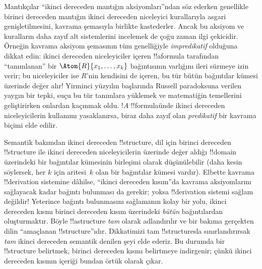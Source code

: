Mantıkçılar ``ikinci dereceden mantığın aksiyomları''ndan söz ederken genellikle
birinci dereceden mantığın ikinci dereceden niceleyici kurallarıyla asgari
genişletilmesini, kavrama şemasıyla birlikte kastederler. Ancak bu aksiyom ve
kuralların daha zayıf alt sistemlerini incelemek de çoğu zaman ilgi çekicidir.
Örneğin kavrama aksiyom şemasının tüm genelliğiyle \emph{impredikatif}
olduğuna dikkat edin: ikinci dereceden niceleyiciler içeren !!a{formula}
tarafından ``tanımlanan'' bir $\Atom{R}{x_1, \dots, x_k}$ bağıntısının varlığını
ileri sürmeye izin verir; bu niceleyiciler ise $R$'nin kendisini de içeren,
bu tür bütün bağıntılar kümesi üzerinde değer alır!{} Yirminci yüzyılın
başlarında Russell paradoksuna verilen yaygın bir tepki, suçu bu tür
tanımlara yüklemek ve matematiğin temellerini geliştirirken onlardan kaçınmak
oldu. $!A$ !!{formula}{}ünde ikinci dereceden niceleyicilerin kullanımı
yasaklanırsa, biraz daha zayıf olan {\em predikatif} bir kavrama biçimi elde
edilir.

Semantik bakımdan ikinci dereceden !!{structure}, dil için birinci dereceden
!!{structure} ile ikinci dereceden niceleyicilerin üzerinde değer aldığı
!!{domain} üzerindeki bir bağıntılar kümesinin birleşimi olarak düşünülebilir
(daha kesin söylersek, her $k$ için aritesi~$k$ olan bir bağıntılar kümesi
vardır). Elbette kavrama !!{derivation} sistemine dâhilse, ``ikinci dereceden
kısım''da kavrama aksiyomlarını sağlayacak kadar bağıntı bulunması da gerekir;
yoksa !!{derivation} sistemi sağlam değildir!{} Yeterince bağıntı bulunmasını
sağlamanın kolay bir yolu, ikinci dereceden kısmı birinci dereceden kısım
üzerindeki \emph{bütün} bağıntılardan oluşturmaktır. Böyle !!a{structure}
\emph{tam} olarak adlandırılır ve bir bakıma gerçekten dilin ``amaçlanan
!!{structure}''ıdır. Dikkatimizi tam !!{structure}s{}la sınırlandırırsak
\emph{tam} ikinci dereceden semantik denilen şeyi elde ederiz. Bu durumda bir
!!{structure} belirtmek, birinci dereceden kısmı belirtmeye indirgenir; çünkü
ikinci dereceden kısmın içeriği bundan örtük olarak çıkar.

